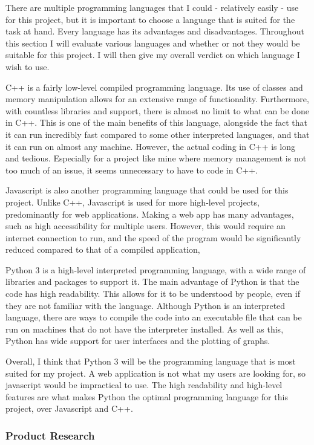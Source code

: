 \documentclass[12pt]{article}
\begin{document}
There are multiple programming languages that I could - relatively easily -  use for this project, but it is important to choose a language that is suited for the task at hand. Every language has its advantages and disadvantages. Throughout this section I will evaluate various languages and whether or not they would be suitable for this project. I will then give my overall verdict on which language I wish to use.

C++ is a fairly low-level compiled programming language. Its use of classes and memory manipulation allows for an extensive range of functionality. Furthermore, with countless libraries and support, there is almost no limit to what can be done in C++. This is one of the main benefits of this language, alongside the fact that it can run incredibly fast compared to some other interpreted languages, and that it can run on almost any machine. However, the actual coding in C++ is long and tedious. Especially for a project like mine where memory management is not too much of an issue, it seems unnecessary to have to code in C++.

Javascript is also another programming language that could be used for this project. Unlike C++, Javascript is used for more high-level projects, predominantly for web applications.  Making a web app has many advantages, such as high accessibility for multiple users. However, this would require an internet connection to run, and the speed of the program would be significantly reduced compared to that of a compiled application,

Python 3 is a high-level interpreted programming language, with a wide range of libraries and packages to support it. The main advantage of Python is that the code has high readability. This allows for it to be understood by people, even if they are not familiar with the language. Although Python is an interpreted language, there are ways to compile the code into an executable file that can be run on machines that do not have the interpreter installed. As well as this, Python has wide support for user interfaces and the plotting of graphs.

Overall, I think that Python 3 will be the programming language that is most suited for my project. A web application is not what my users are looking for, so javascript would be impractical to use. The high readability and high-level features are what makes Python the optimal programming language for this project, over Javascript and C++.
\clearpage
\subsubsection{Product Research}
\end{document}

